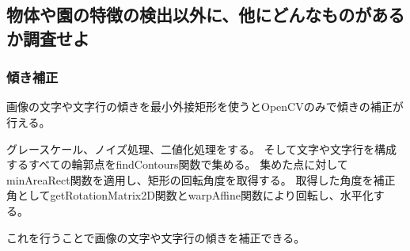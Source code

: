 \documentclass{ltjsarticle}
\begin{document}
\subsection{物体や園の特徴の検出以外に、他にどんなものがあるか調査せよ}
\subsubsection{傾き補正}
画像の文字や文字行の傾きを最小外接矩形を使うとOpenCVのみで傾きの補正が行える。

グレースケール、ノイズ処理、二値化処理をする。
そして文字や文字行を構成するすべての輪郭点をfindContours関数で集める。
集めた点に対してminAreaRect関数を適用し、矩形の回転角度を取得する。
取得した角度を補正角としてgetRotationMatrix2D関数とwarpAffine関数により回転し、水平化する。

これを行うことで画像の文字や文字行の傾きを補正できる。

%
%

\printbibliography
\end{document}
